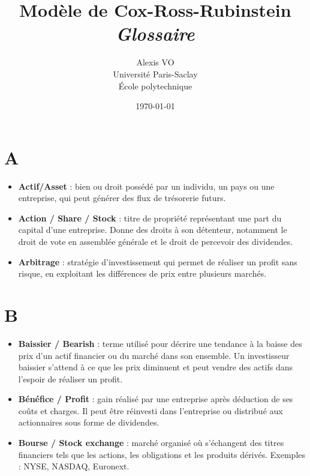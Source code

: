 \documentclass[a4paper,10pt]{article}
\title{\Huge{\textbf{Modèle de Cox-Ross-Rubinstein}}\\ \medskip
      \Huge{\textit{Glossaire}}\vspace*{0.7cm}}
\author{\LARGE{Alexis VO}\vspace{1cm}\\ \medskip
      Université Paris-Saclay\\École polytechnique}
\date{\vspace{0.2cm}\today}
\begin{document}
\vspace{\fill}
  \maketitle
\vspace{\fill}

\newpage

\tableofcontents

\newpage

\begin{multicols}{2}

\section*{A}
\begin{itemize}
  \item \textbf{Actif/Asset} : bien ou droit possédé par un individu, un pays ou une entreprise, qui peut générer des flux de trésorerie futurs.
  \item \textbf{Action / Share / Stock} : titre de propriété représentant une part du capital d’une entreprise. Donne des droits à son détenteur, notamment le droit de vote en assemblée générale et le droit de percevoir des dividendes.
  \item \textbf{Arbitrage} : stratégie d’investissement qui permet de réaliser un profit sans risque, en exploitant les différences de prix entre plusieurs marchés.
\end{itemize}

\section*{B}
\begin{itemize}
  \item \textbf{Baissier / Bearish} : terme utilisé pour décrire une tendance à la baisse des prix d’un actif financier ou du marché dans son ensemble. Un investisseur baissier s’attend à ce que les prix diminuent et peut vendre des actifs dans l’espoir de réaliser un profit.
  \item \textbf{Bénéfice / Profit} : gain réalisé par une entreprise après déduction de ses coûts et charges. Il peut être réinvesti dans l’entreprise ou distribué aux actionnaires sous forme de dividendes.
  \item \textbf{Bourse / Stock exchange} : marché organisé où s’échangent des titres financiers tels que les actions, les obligations et les produits dérivés. Exemples : NYSE, NASDAQ, Euronext.
\end{itemize}


\end{multicols}
\end{document}

